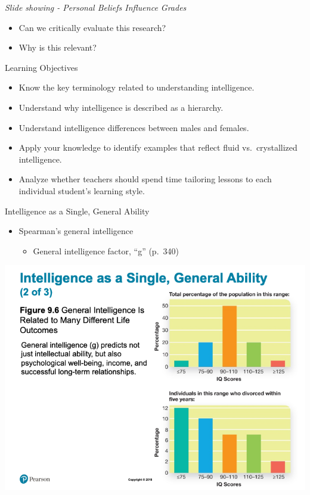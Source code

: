\documentclass[
]{book}
\providecommand{\tightlist}{%
  \setlength{\itemsep}{0pt}\setlength{\parskip}{0pt}}
\begin{document}
\begin{reflect}
\emph{Slide showing - Personal Beliefs Influence Grades}

\begin{itemize}
\tightlist
\item
  Can we critically evaluate this research?\\
\item
  Why is this relevant?
\end{itemize}

Learning Objectives

\begin{itemize}
\tightlist
\item
  Know the key terminology related to understanding intelligence.\\
\item
  Understand why intelligence is described as a hierarchy.\\
\item
  Understand intelligence differences between males and females.\\
\item
  Apply your knowledge to identify examples that reflect fluid vs.~crystallized intelligence.\\
\item
  Analyze whether teachers should spend time tailoring lessons to each individual student's learning style.
\end{itemize}

Intelligence as a Single, General Ability

\begin{itemize}
\tightlist
\item
  Spearman's general intelligence

  \begin{itemize}
  \tightlist
  \item
    General intelligence factor, ``g'' (p.~340)
  \end{itemize}
\end{itemize}

\includegraphics{assets/unit_2/slide_23.png}


\end{reflect}
\end{document}
